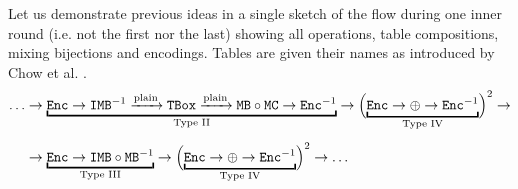 	Let us demonstrate previous ideas in a single sketch of the flow during one inner round (i.e. not the first nor the last) showing all operations, table compositions, mixing bijections and encodings. Tables are given their names as introduced by Chow et al. \cite{chow2003aes}.
	\begin{align}
		\ldots&\rarr\underbracket{\Enc\rarr\IMB^{-1}\xrightarrow{\textnormal{plain}}\TBox\xrightarrow{\textnormal{plain}}\MB\circ\MC\rarr\Enc^{-1}}_{\textnormal{Type II}}\rarr\Bigl(\underbracket{\Enc\rarr\xor\rarr\Enc^{-1}}_{\textnormal{Type IV}}\Bigr)^2\rarr\nonumber\\[.5em]
		&\rarr\underbracket{\Enc\rarr\IMB\circ\MB^{-1}}_{\textnormal{Type III}}\rarr\Bigl(\underbracket{\Enc\rarr\xor\rarr\Enc^{-1}}_{\textnormal{Type IV}}\Bigr)^2\rarr\ldots
	\end{align}
	
